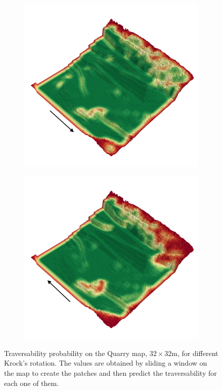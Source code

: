 \documentclass[../document.tex]{subfiles}
\begin{document}
\begin{figure}[H]
\begin{subfigure}[b]{0.45\textwidth}
\end{subfigure}
\begin{subfigure}[b]{0.45\textwidth}
  \includegraphics[width=\linewidth]{../img/4/traversability/quarry/-0.png}
\end{subfigure}
\begin{subfigure}[b]{0.45\textwidth}
    \includegraphics[width=\linewidth]{../img/4/traversability/quarry/-180.png}  
\end{subfigure}
\caption{Traversability probability on the Quarry map, $32\times 32$m, for different Krock's rotation. The values are obtained by sliding a window on the map to create the patches and then predict the traversability for each one of them.}
\end{figure}
\end{document}
